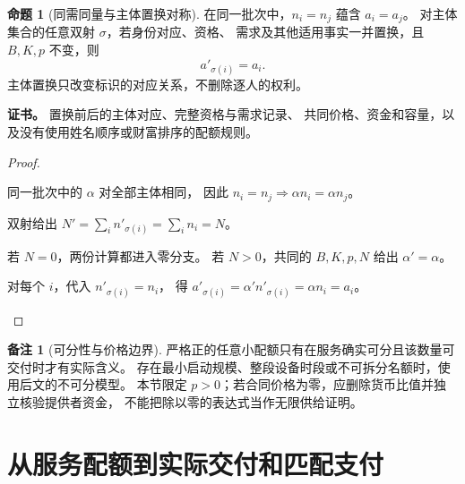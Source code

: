 \documentclass[UTF8,12pt,a4paper,openany,fontset=none,zihao=false]{ctexrep}
\theoremstyle{definition}
\newtheorem{proposition}{命题}[chapter]
\newtheorem{remark}{备注}[chapter]
\newenvironment{certificate}{\par\noindent\textbf{证书。}\ignorespaces}{\par}
\newcommand{\1}{\mathbf 1}
\begin{document}
\begin{proposition}[同需同量与主体置换对称]
\label{access:symmetry}
在同一批次中，\(n_i=n_j\) 蕴含 \(a_i=a_j\)。
对主体集合的任意双射 \(\sigma\)，若身份对应、资格、
需求及其他适用事实一并置换，且 \(B,K,p\) 不变，则
\[
a'_{\sigma(i)}=a_i.
\]
主体置换只改变标识的对应关系，不删除逐人的权利。
\end{proposition}
\begin{certificate}
置换前后的主体对应、完整资格与需求记录、
共同价格、资金和容量，以及没有使用姓名顺序或财富排序的配额规则。
\end{certificate}
\begin{proof}
\begin{semanticsteps}
\item 同一批次中的 \(\alpha\) 对全部主体相同，
因此 \(n_i=n_j\Rightarrow\alpha n_i=\alpha n_j\)。
\item 双射给出
\(N'=\sum_i n'_{\sigma(i)}=\sum_i n_i=N\)。
\item 若 \(N=0\)，两份计算都进入零分支。
若 \(N>0\)，共同的 \(B,K,p,N\) 给出 \(\alpha'=\alpha\)。
\item 对每个 \(i\)，代入 \(n'_{\sigma(i)}=n_i\)，
得 \(a'_{\sigma(i)}=\alpha'n'_{\sigma(i)}=\alpha n_i=a_i\)。
\end{semanticsteps}
\end{proof}

\begin{remark}[可分性与价格边界]
严格正的任意小配额只有在服务确实可分且该数量可交付时才有实际含义。
存在最小启动规模、整段设备时段或不可拆分名额时，使用后文的不可分模型。
本节限定 \(p>0\)；若合同价格为零，应删除货币比值并独立核验提供者资金，
不能把除以零的表达式当作无限供给证明。
\end{remark}

\section{从服务配额到实际交付和匹配支付}
\end{document}
